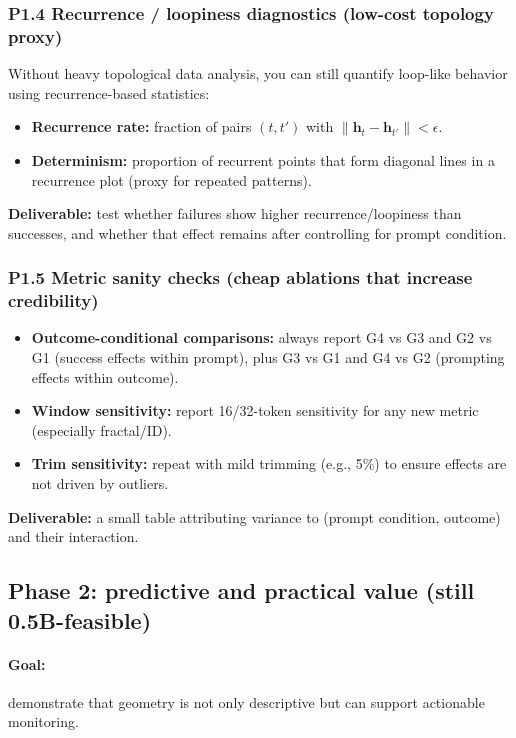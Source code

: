 \subsubsection{P1.4 Recurrence / loopiness diagnostics (low-cost topology proxy)}

Without heavy topological data analysis, you can still quantify loop-like behavior using recurrence-based statistics:
\begin{itemize}[leftmargin=*]
\item \textbf{Recurrence rate:} fraction of pairs $(t,t')$ with $\lVert\mathbf{h}_t-\mathbf{h}_{t'}\rVert < \epsilon$.
\item \textbf{Determinism:} proportion of recurrent points that form diagonal lines in a recurrence plot (proxy for repeated patterns).
\end{itemize}

\textbf{Deliverable:} test whether failures show higher recurrence/loopiness than successes, and whether that effect remains after controlling for prompt condition.

\subsubsection{P1.5 Metric sanity checks (cheap ablations that increase credibility)}

\begin{itemize}[leftmargin=*]
\item \textbf{Outcome-conditional comparisons:} always report G4 vs G3 and G2 vs G1 (success effects within prompt), plus G3 vs G1 and G4 vs G2 (prompting effects within outcome).
\item \textbf{Window sensitivity:} report 16/32-token sensitivity for any new metric (especially fractal/ID).
\item \textbf{Trim sensitivity:} repeat with mild trimming (e.g., 5\%) to ensure effects are not driven by outliers.
\end{itemize}

\textbf{Deliverable:} a small table attributing variance to (prompt condition, outcome) and their interaction.

\subsection{Phase 2: predictive and practical value (still 0.5B-feasible)}

\paragraph{Goal:} demonstrate that geometry is not only descriptive but can support actionable monitoring.

